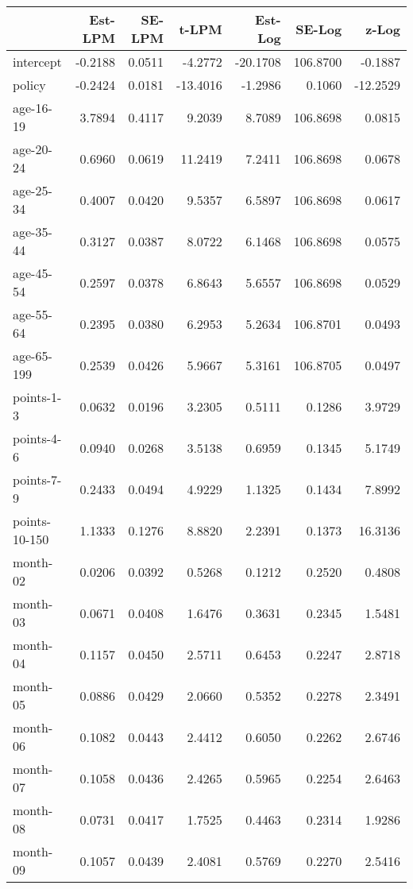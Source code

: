 \documentclass[10pt]{article}
\begin{document}
\begin{table}[ht]
\centering
\begin{tabular}{lrrrrrr}
  \hline
 & Est-LPM & SE-LPM & t-LPM & Est-Log & SE-Log & z-Log \\ 
  \hline
intercept & -0.2188 & 0.0511 & -4.2772 & -20.1708 & 106.8700 & -0.1887 \\ 
  policy & -0.2424 & 0.0181 & -13.4016 & -1.2986 & 0.1060 & -12.2529 \\ 
  age-16-19 & 3.7894 & 0.4117 & 9.2039 & 8.7089 & 106.8698 & 0.0815 \\ 
  age-20-24 & 0.6960 & 0.0619 & 11.2419 & 7.2411 & 106.8698 & 0.0678 \\ 
  age-25-34 & 0.4007 & 0.0420 & 9.5357 & 6.5897 & 106.8698 & 0.0617 \\ 
  age-35-44 & 0.3127 & 0.0387 & 8.0722 & 6.1468 & 106.8698 & 0.0575 \\ 
  age-45-54 & 0.2597 & 0.0378 & 6.8643 & 5.6557 & 106.8698 & 0.0529 \\ 
  age-55-64 & 0.2395 & 0.0380 & 6.2953 & 5.2634 & 106.8701 & 0.0493 \\ 
  age-65-199 & 0.2539 & 0.0426 & 5.9667 & 5.3161 & 106.8705 & 0.0497 \\ 
  points-1-3 & 0.0632 & 0.0196 & 3.2305 & 0.5111 & 0.1286 & 3.9729 \\ 
  points-4-6 & 0.0940 & 0.0268 & 3.5138 & 0.6959 & 0.1345 & 5.1749 \\ 
  points-7-9 & 0.2433 & 0.0494 & 4.9229 & 1.1325 & 0.1434 & 7.8992 \\ 
  points-10-150 & 1.1333 & 0.1276 & 8.8820 & 2.2391 & 0.1373 & 16.3136 \\ 
  month-02 & 0.0206 & 0.0392 & 0.5268 & 0.1212 & 0.2520 & 0.4808 \\ 
  month-03 & 0.0671 & 0.0408 & 1.6476 & 0.3631 & 0.2345 & 1.5481 \\ 
  month-04 & 0.1157 & 0.0450 & 2.5711 & 0.6453 & 0.2247 & 2.8718 \\ 
  month-05 & 0.0886 & 0.0429 & 2.0660 & 0.5352 & 0.2278 & 2.3491 \\ 
  month-06 & 0.1082 & 0.0443 & 2.4412 & 0.6050 & 0.2262 & 2.6746 \\ 
  month-07 & 0.1058 & 0.0436 & 2.4265 & 0.5965 & 0.2254 & 2.6463 \\ 
  month-08 & 0.0731 & 0.0417 & 1.7525 & 0.4463 & 0.2314 & 1.9286 \\ 
  month-09 & 0.1057 & 0.0439 & 2.4081 & 0.5769 & 0.2270 & 2.5416 \\ 

\end{tabular}
\end{table}
\end{document}
